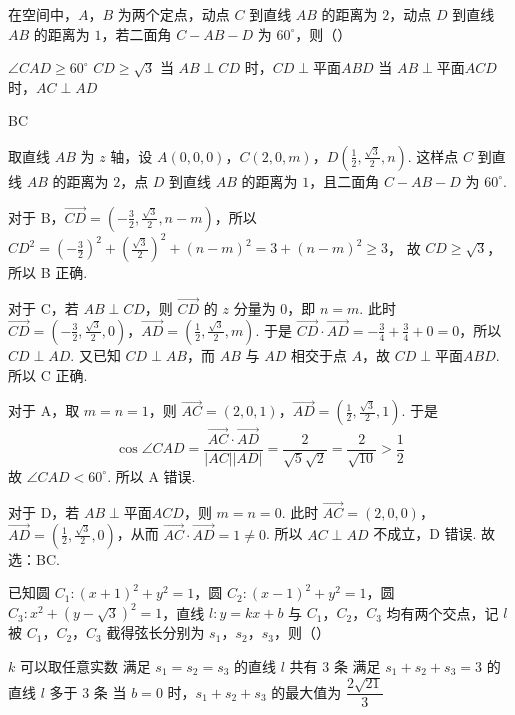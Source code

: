 \begin{problem}
在空间中，\(A\)，\(B\) 为两个定点，动点 \(C\) 到直线 \(AB\) 的距离为 \(2\)，动点 \(D\) 到直线 \(AB\) 的距离为 \(1\)，若二面角 \(C-AB-D\) 为 \(60^\circ\)，则（\quad）

\choices
    {\(\angle CAD\ge 60^\circ\)}
    {\(CD\ge \sqrt{3}\)}
    {当 \(AB\perp CD\) 时，\(CD\perp \text{平面} ABD\)}
    {当 \(AB\perp \text{平面} ACD\) 时，\(AC\perp AD\)}
\end{problem}

\begin{answer}
BC
\end{answer}

\begin{solution}
取直线 \(AB\) 为 \(z\) 轴，设 \(A(0,0,0)\)，\(C(2,0,m)\)，\(D\left( \frac{1}{2},\frac{\sqrt{3}}{2},n \right)\). 这样点 \(C\) 到直线 \(AB\) 的距离为 \(2\)，点 \(D\) 到直线 \(AB\) 的距离为 \(1\)，且二面角 \(C-AB-D\) 为 \(60^\circ\).

对于 B，\(\overrightarrow{CD}=\left( -\frac{3}{2},\frac{\sqrt{3}}{2},n-m \right)\)，所以
\(
CD^2=\left( -\frac{3}{2} \right)^2+\left( \frac{\sqrt{3}}{2} \right)^2+\left( n-m \right)^2=3+\left( n-m \right)^2\ge 3
\)，
故 \(CD\ge \sqrt{3}\)，所以 B 正确.

对于 C，若 \(AB\perp CD\)，则 \(\overrightarrow{CD}\) 的 \(z\) 分量为 \(0\)，即 \(n=m\). 此时 \(\overrightarrow{CD}=\left( -\frac{3}{2},\frac{\sqrt{3}}{2},0 \right)\)，\(\overrightarrow{AD}=\left( \frac{1}{2},\frac{\sqrt{3}}{2},m \right)\). 于是 \(\overrightarrow{CD}\cdot \overrightarrow{AD}=-\frac{3}{4}+\frac{3}{4}+0=0\)，所以 \(CD\perp AD\). 又已知 \(CD\perp AB\)，而 \(AB\) 与 \(AD\) 相交于点 \(A\)，故 \(CD\perp \text{平面} ABD\).
所以 C 正确.

对于 A，取 \(m=n=1\)，则 \(\overrightarrow{AC}=(2,0,1)\)，\(\overrightarrow{AD}=\left( \frac{1}{2},\frac{\sqrt{3}}{2},1 \right)\). 于是
\[
\cos \angle CAD=\frac{\overrightarrow{AC}\cdot \overrightarrow{AD}}{\lvert AC\rvert \lvert AD\rvert}=\frac{2}{\sqrt{5}\sqrt{2}}=\frac{2}{\sqrt{10}}>\frac{1}{2}
\]
故 \(\angle CAD<60^\circ\). 所以 A 错误.

对于 D，若 \(AB\perp \text{平面} ACD\)，则 \(m=n=0\). 此时 \(\overrightarrow{AC}=(2,0,0)\)，\(\overrightarrow{AD}=\left( \frac{1}{2},\frac{\sqrt{3}}{2},0 \right)\)，从而 \(\overrightarrow{AC}\cdot \overrightarrow{AD}=1\ne 0\).
所以 \(AC\perp AD\) 不成立，D 错误.
故选：BC.
\end{solution}

\begin{problem}
已知圆 \(C_1:(x+1)^2+y^2=1\)，圆 \(C_2:(x-1)^2+y^2=1\)，圆 \(C_3:x^2+\left( y-\sqrt{3} \right)^2=1\)，直线 \(l:y=kx+b\) 与 \(C_1\)，\(C_2\)，\(C_3\) 均有两个交点，记 \(l\) 被 \(C_1\)，\(C_2\)，\(C_3\) 截得弦长分别为 \(s_1\)，\(s_2\)，\(s_3\)，则（\quad）

\choices
    {\(k\) 可以取任意实数}
    {满足 \(s_1=s_2=s_3\) 的直线 \(l\) 共有 \(3\) 条}
    {满足 \(s_1+s_2+s_3=3\) 的直线 \(l\) 多于 \(3\) 条}
    {当 \(b=0\) 时，\(s_1+s_2+s_3\) 的最大值为 \(\dfrac{2\sqrt{21}}{3}\)}
\end{problem}

